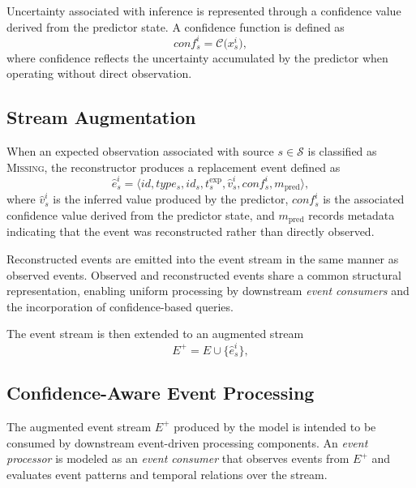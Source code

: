 Uncertainty associated with inference is represented through a confidence value derived from the predictor state. A confidence function is defined as
\begin{equation}
conf_s^{i} = \mathcal{C}\bigl(x_s^{i}\bigr),
\end{equation}
\noindent
where confidence reflects the uncertainty accumulated by the predictor when operating without direct observation.

\subsection{Stream Augmentation}
\label{sec:confidence-stream-augmentation}

When an expected observation associated with source $s \in \mathcal{S}$ is classified as \textsc{Missing}, the reconstructor produces a replacement event defined as
\begin{equation}
\hat{e}_s^{i} =
\langle id, type_s, id_s, t^{\mathrm{exp}}_s, \hat{v}_s^{i}, conf_s^{i}, m_{\mathrm{pred}} \rangle ,
\end{equation}
\noindent
where $\hat{v}_s^{i}$ is the inferred value produced by the predictor, $conf_s^{i}$ is the associated confidence value derived from the predictor state, and $m_{\mathrm{pred}}$ records metadata indicating that the event was reconstructed rather than directly observed.

Reconstructed events are emitted into the event stream in the same manner as observed events. Observed and reconstructed events share a common structural representation, enabling uniform processing by downstream \emph{event consumers} and the incorporation of confidence-based queries.

The event stream is then extended to an augmented stream
\begin{equation}
E^{+} = E \cup \{ \hat{e}_s^{i} \},
\end{equation}




\subsection{Confidence-Aware Event Processing}
\label{sec:confidence-aware-semantics}

The augmented event stream $E^{+}$ produced by the model is intended to be consumed by downstream event-driven processing components. An \emph{event processor} is modeled as an \emph{event consumer} that observes events from $E^{+}$ and evaluates event patterns and temporal relations over the stream.

